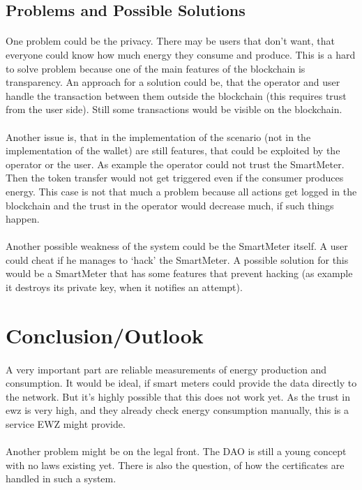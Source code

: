 \documentclass{scrartcl}
\begin{document}
	\subsection{Problems and Possible Solutions}
	
	\paragraph{}
	One problem could be the privacy. There may be users that don’t want, that everyone could know how much energy they consume and produce. This is a hard to solve problem because one of the main features of the blockchain is transparency. An approach for a solution could be, that the operator and user handle the transaction between them outside the blockchain (this requires trust from the user side). Still some transactions would be visible on the blockchain.
	
	\paragraph{}
	Another issue is, that in the implementation of the scenario (not in the implementation of the wallet) are still features, that could be exploited by the operator or the user. As example the operator could not trust the SmartMeter. Then the token transfer would not get triggered even if the consumer produces energy. This case is not that much a problem because all actions get logged in the blockchain and the trust in the operator would decrease much, if such things happen. 
	
	\paragraph{}
	Another possible weakness of the system could be the SmartMeter itself. A user could cheat if he manages to ‘hack’ the SmartMeter. A possible solution for this would be a SmartMeter that has some features that prevent hacking (as example it destroys its private key, when it notifies an attempt).
	
    \section{Conclusion/Outlook}
    
    
    
	\paragraph{}
	A very important part are reliable measurements of energy production and consumption. It would be ideal, if smart meters could provide the data directly to the network. But it's highly possible that this does not work yet. As the trust in ewz is very high, and they already check energy consumption manually, this is a service EWZ might provide.
	
    \paragraph{}
	Another problem might be on the legal front. The DAO is still a young concept with no laws existing yet. There is also the question, of how the certificates are handled in such a system.  
    
\end{document}
